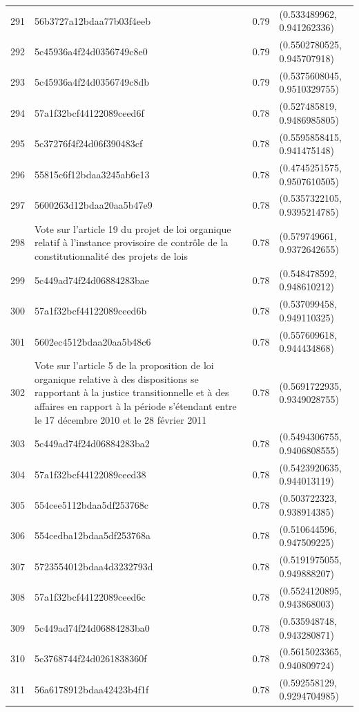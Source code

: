 \begin{table}[ht]
\begin{tabular}{rlrl}
  291 & 56b3727a12bdaa77b03f4eeb & 0.79 & (0.533489962, 0.941262336) \\ 
  292 & 5c45936a4f24d0356749c8e0 & 0.79 & (0.5502780525, 0.945707918) \\ 
  293 & 5c45936a4f24d0356749c8db & 0.79 & (0.5375608045, 0.9510329755) \\ 
  294 & 57a1f32bcf44122089ceed6f & 0.78 & (0.527485819, 0.9486985805) \\ 
  295 & 5c37276f4f24d06f390483cf & 0.78 & (0.5595858415, 0.941475148) \\ 
  296 & 55815c6f12bdaa3245ab6e13 & 0.78 & (0.4745251575, 0.9507610505) \\ 
  297 & 5600263d12bdaa20aa5b47e9 & 0.78 & (0.5357322105, 0.9395214785) \\ 
  298 & Vote sur l'article 19 du projet de loi organique relatif à l'instance provisoire de contrôle de la constitutionnalité des projets de lois & 0.78 & (0.579749661, 0.9372642655) \\ 
  299 & 5c449ad74f24d06884283bae & 0.78 & (0.548478592, 0.948610212) \\ 
  300 & 57a1f32bcf44122089ceed6b & 0.78 & (0.537099458, 0.949110325) \\ 
  301 & 5602ec4512bdaa20aa5b48c6 & 0.78 & (0.557609618, 0.944434868) \\ 
  302 & Vote sur l'article 5 de la proposition de loi organique relative à des dispositions se rapportant à la justice transitionnelle et à des affaires en rapport à la période s'étendant entre le 17 décembre 2010 et le 28 février 2011 & 0.78 & (0.5691722935, 0.9349028755) \\ 
  303 & 5c449ad74f24d06884283ba2 & 0.78 & (0.5494306755, 0.9406808555) \\ 
  304 & 57a1f32bcf44122089ceed38 & 0.78 & (0.5423920635, 0.944013119) \\ 
  305 & 554cee5112bdaa5df253768c & 0.78 & (0.503722323, 0.938914385) \\ 
  306 & 554cedba12bdaa5df253768a & 0.78 & (0.510644596, 0.947509225) \\ 
  307 & 5723554012bdaa4d3232793d & 0.78 & (0.5191975055, 0.949888207) \\ 
  308 & 57a1f32bcf44122089ceed6c & 0.78 & (0.5524120895, 0.943868003) \\ 
  309 & 5c449ad74f24d06884283ba0 & 0.78 & (0.535948748, 0.943280871) \\ 
  310 & 5c3768744f24d0261838360f & 0.78 & (0.5615023365, 0.940809724) \\ 
  311 & 56a6178912bdaa42423b4f1f & 0.78 & (0.592558129, 0.9294704985) \\ 

\end{tabular}
\end{table}
